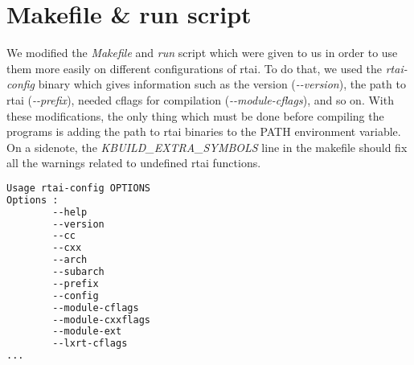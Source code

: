 \section{Makefile \& run script}

We modified the \emph{Makefile} and \emph{run} script which were given to us in order to use them more easily on different configurations of rtai. To do that, we used the \emph{rtai-config} binary which gives information such as the version (\emph{-{}-version}), the path to rtai (\emph{-{}-prefix}), needed cflags for compilation (\emph{-{}-module-cflags}), and so on. With these modifications, the only thing which must be done before compiling the programs is adding the path to rtai binaries to the PATH environment variable. On a sidenote, the \emph{KBUILD\_EXTRA\_SYMBOLS} line in the makefile should fix all the warnings related to undefined rtai functions.

\begin{lstlisting}[language=sh,caption={rtai-config help}]
Usage rtai-config OPTIONS
Options :
        --help
        --version
        --cc
        --cxx
        --arch
        --subarch
        --prefix
        --config
        --module-cflags
        --module-cxxflags
        --module-ext
        --lxrt-cflags
...
\end{lstlisting}



